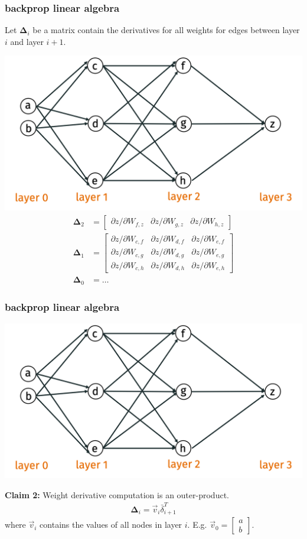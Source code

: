 \documentclass[handout,compress]{beamer}
\newcommand{\bs}[1]{\boldsymbol{#1}}
\begin{document}
\begin{frame}
	\frametitle{backprop linear algebra}
	\small
	
	Let $\bs{\Delta}_i$ be a matrix contain the derivatives for all weights for edges between layer $i$ and layer $i+1$. 
	
	\includegraphics[width=.5\textwidth]{backpro_example.png}
	\begin{align*}
\bs{\Delta}_2 &= \begin{bmatrix}\partial z/\partial W_{f,z}&\partial z/\partial W_{g,z}& \partial z/\partial W_{h,z}\end{bmatrix} \\
\bs{\Delta}_1 &= \begin{bmatrix}\partial z/\partial W_{c,f}&\partial z/\partial W_{d,f}& \partial z/\partial W_{e,f}\\
\partial z/\partial W_{c,g}&\partial z/\partial W_{d,g}& \partial z/\partial W_{e,g}\\
\partial z/\partial W_{c,h}&\partial z/\partial W_{d,h}& \partial z/\partial W_{e,h}
\end{bmatrix}\\
\bs{\Delta}_0 &= \ldots
\end{align*}
\end{frame}

\begin{frame}
\frametitle{backprop linear algebra}
	\small
	
	\includegraphics[width=.5\textwidth]{backpro_example.png}
	
	\textbf{Claim 2:} Weight derivative computation is an outer-product.
	\begin{align*}
	\bs{\Delta}_i = \vec{v}_i\bar{\delta}_{i+1}^T
	\end{align*}
	where $\vec{v}_i$ contains the values of all nodes in layer $i$. E.g. $\vec{v}_0 = \begin{bmatrix}
	a\\b
	\end{bmatrix}$. 
\end{frame}
\end{document}
